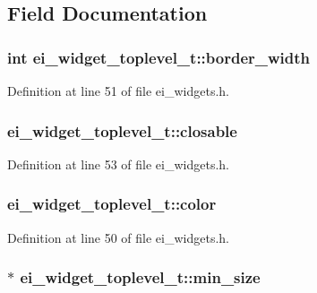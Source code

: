 \subsection{Field Documentation}
\hypertarget{structei__widget__toplevel__t_ac3487d8274c78d4bb79a34d98d54f86e}{
\subsubsection[{border\-\_\-width}]{\setlength{\rightskip}{0pt plus 5cm}int ei\-\_\-widget\-\_\-toplevel\-\_\-t\-::border\-\_\-width}}\label{structei__widget__toplevel__t_ac3487d8274c78d4bb79a34d98d54f86e}


Definition at line 51 of file ei\-\_\-widgets.\-h.

\hypertarget{structei__widget__toplevel__t_a3e8fb2c934a21fd631ddbe2c8ff272db}{
\subsubsection[{closable}]{ ei\-\_\-widget\-\_\-toplevel\-\_\-t\-::closable}}\label{structei__widget__toplevel__t_a3e8fb2c934a21fd631ddbe2c8ff272db}


Definition at line 53 of file ei\-\_\-widgets.\-h.

\hypertarget{structei__widget__toplevel__t_a4004d31b3b9d5e6a2f80bca288c1c31b}{
\subsubsection[{color}]{ ei\-\_\-widget\-\_\-toplevel\-\_\-t\-::color}}\label{structei__widget__toplevel__t_a4004d31b3b9d5e6a2f80bca288c1c31b}


Definition at line 50 of file ei\-\_\-widgets.\-h.

\hypertarget{structei__widget__toplevel__t_afe0e3eb72d1504e32f13a163a51d5149}{
\subsubsection[{min\-\_\-size}]{$\ast$ ei\-\_\-widget\-\_\-toplevel\-\_\-t\-::min\-\_\-size}}\label{structei__widget__toplevel__t_afe0e3eb72d1504e32f13a163a51d5149}


